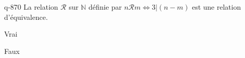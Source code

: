 \begin{truefalse}{q-870}
La relation $\mathcal R$ sur $\mathbb N$ définie par $n\mathcal R m \iff 3 | (n-m)$ est une relation d'équivalence.
\item* Vrai
\item Faux
\end{truefalse}

